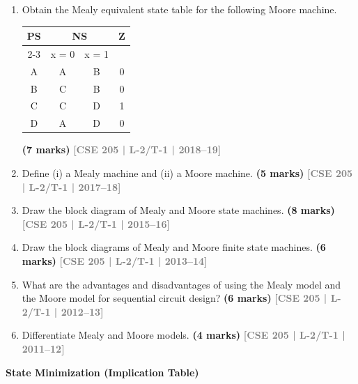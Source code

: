 \documentclass[12pt,a3paper]{article}
\newcommand{\yr}[1]{\hfill\textcolor{gray}{\small\textbf{[#1]}}}
\newcommand{\mk}[1]{\textcolor{orange!70!black}{\small\textbf{(#1 marks)}}}
\newcommand{\subtopic}[2]{%
  \vspace{10pt}
  \noindent\begin{tcolorbox}[colback=#1!8,colframe=#1,boxrule=0.6pt,arc=4pt,
    left=6pt,right=6pt,top=4pt,bottom=4pt]
    \small\bfseries\textcolor{#1}{#2}
  \end{tcolorbox}
  \vspace{2pt}
}
\begin{document}
\begin{enumerate}
\mk{5} \yr{CSE 205 | L-2/T-1 | 2021--22}

\item Obtain the Mealy equivalent state table for the following Moore machine.

\begin{center}
  \begin{tabular}{|c|c|c|c|}
\hline
\multirow{2}{*}{PS} & \multicolumn{2}{c|}{NS} & \multirow{2}{*}{Z} \\ \cline{2-3}
 & x = 0 & x = 1 & \\ \hline
A & A & B & 0 \\ \hline
B & C & B & 0 \\ \hline
C & C & D & 1 \\ \hline
D & A & D & 0 \\ \hline
\end{tabular}
\end{center}

\mk{7} \yr{CSE 205 | L-2/T-1 | 2018--19}

\item Define (i) a Mealy machine and (ii) a Moore machine.
\mk{5} \yr{CSE 205 | L-2/T-1 | 2017--18}


\item Draw the block diagram of Mealy and Moore state machines.
\mk{8} \yr{CSE 205 | L-2/T-1 | 2015--16}


\item Draw the block diagrams of Mealy and Moore finite state machines.
\mk{6} \yr{CSE 205 | L-2/T-1 | 2013--14}


\item What are the advantages and disadvantages of using the Mealy model and the Moore model for sequential circuit design?
\mk{6} \yr{CSE 205 | L-2/T-1 | 2012--13}

\item Differentiate Mealy and Moore models.
\mk{4} \yr{CSE 205 | L-2/T-1 | 2011--12}

\end{enumerate}
\subtopic{cF}{State Minimization (Implication Table)}
\end{document}
